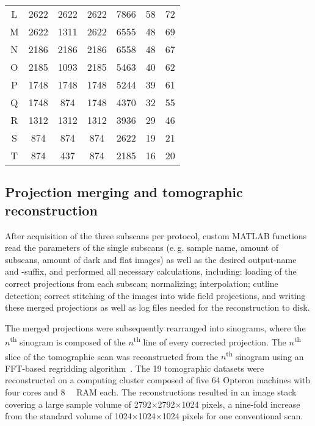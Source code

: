 \begin{table}
\begin{tabular}{ccccccc}
		\ifhtml\else\rowcolor{lightgray}\fi L  & 2622 & 2622 & 2622 & 7866  &  58 & 72\\
		M & 2622 & 1311 & 2622 & 6555  &  48 & 69\\
		N & 2186 & 2186 & 2186 & 6558  &  48 & 67\\
		O & 2185 & 1093 & 2185 & 5463  &  40 & 62\\
		P & 1748 & 1748 & 1748 & 5244  &  39 & 61\\
		Q & 1748 & 874  & 1748 & 4370  &  32 & 55\\
		R & 1312 & 1312 & 1312 & 3936  &  29 & 46\\
		S & 874  & 874  & 874  & 2622  &  19 & 21\\
		\ifhtml\else\rowcolor{lightgray}\fi T & 874  & 437  & 874  & 2185  &  16  & 20\\
	\end{tabular}
\end{table}

\subsection{Projection merging and tomographic reconstruction}
After acquisition of the three subscans per protocol, custom MATLAB functions read the parameters of the single subscans (e.\,g. sample name, amount of subscans, amount of dark and flat images) as well as the desired output-name and -suffix, and performed all necessary calculations, including: loading of the correct projections from each subscan; normalizing; interpolation; cutline detection; correct stitching of the images into wide field projections, and writing these merged projections as well as log files needed for the reconstruction to disk.

The merged projections were subsequently rearranged into sinograms, where the $n$\textsuperscript{th} sinogram is composed of the $n$\textsuperscript{th} line of every corrected projection. The $n$\textsuperscript{th} slice of the tomographic scan was reconstructed from the $n$\textsuperscript{th} sinogram using an FFT-based regridding algorithm~\cite{Dowd1999,Marone2008}. The 19 tomographic datasets were reconstructed on a computing cluster composed of five \SI{64}{\bit} Opteron machines with four cores and \SI{8}{\giga\byte} RAM each. The reconstructions resulted in an image stack covering a large sample volume of 2792$\times$2792$\times$1024 pixels, a nine-fold increase from the standard volume of 1024$\times$1024$\times$1024 pixels for one conventional scan.